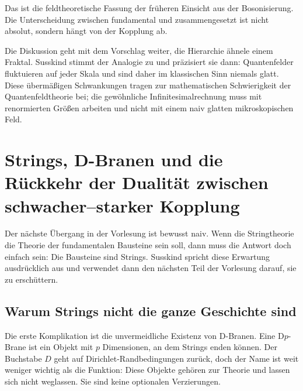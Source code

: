 Das ist die feldtheoretische Fassung der früheren Einsicht aus der Bosonisierung. Die Unterscheidung zwischen fundamental und zusammengesetzt ist nicht absolut, sondern hängt von der Kopplung ab.

\begin{classroomqa}\end{classroomqa}

Die Diskussion geht mit dem Vorschlag weiter, die Hierarchie ähnele einem Fraktal. Susskind stimmt der Analogie zu und präzisiert sie dann: Quantenfelder fluktuieren auf jeder Skala und sind daher im klassischen Sinn niemals glatt. Diese übermäßigen Schwankungen tragen zur mathematischen Schwierigkeit der Quantenfeldtheorie bei; die gewöhnliche Infinitesimalrechnung muss mit renormierten Größen arbeiten und nicht mit einem naiv glatten mikroskopischen Feld.

\section{Strings, D-Branen und die Rückkehr der Dualität zwischen schwacher--starker Kopplung}

Der nächste Übergang in der Vorlesung ist bewusst naiv. Wenn die Stringtheorie die Theorie der fundamentalen Bausteine sein soll, dann muss die Antwort doch einfach sein: Die Bausteine sind Strings. Susskind spricht diese Erwartung ausdrücklich aus und verwendet dann den nächsten Teil der Vorlesung darauf, sie zu erschüttern.

\subsection{Warum Strings nicht die ganze Geschichte sind}

Die erste Komplikation ist die unvermeidliche Existenz von D-Branen. Eine D\(p\)-Brane ist ein Objekt mit \(p\) Dimensionen, an dem Strings enden können. Der Buchstabe \(D\) geht auf Dirichlet-Randbedingungen zurück, doch der Name ist weit weniger wichtig als die Funktion: Diese Objekte gehören zur Theorie und lassen sich nicht weglassen. Sie sind keine optionalen Verzierungen.

